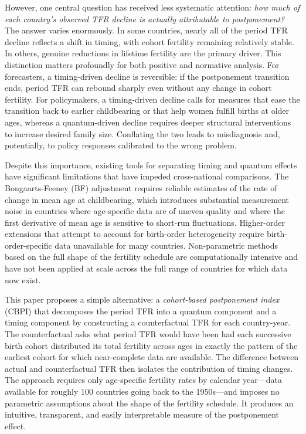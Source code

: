 \documentclass[12pt]{article}
\begin{document}
However, one central question has received less systematic attention:
\emph{how much of each country's observed TFR decline is actually
attributable to postponement?}  The answer varies enormously.  In some
countries, nearly all of the period TFR decline reflects a shift in
timing, with cohort fertility remaining relatively stable.  In others,
genuine reductions in lifetime fertility are the primary driver.  This
distinction matters profoundly for both positive and normative
analysis.  For forecasters, a timing-driven decline is reversible: if
the postponement transition ends, period TFR can rebound sharply even
without any change in cohort fertility.  For policymakers, a
timing-driven decline calls for measures that ease the transition back
to earlier childbearing or that help women fulfill births at older
ages, whereas a quantum-driven decline requires deeper structural
interventions to increase desired family size.  Conflating the two
leads to misdiagnosis and, potentially, to policy responses calibrated
to the wrong problem.

Despite this importance, existing tools for separating timing and
quantum effects have significant limitations that have impeded
cross-national comparisons.  The Bongaarts-Feeney (BF) adjustment
requires reliable estimates of the rate of change in mean age at
childbearing, which introduces substantial measurement noise in
countries where age-specific data are of uneven quality and where the
first derivative of mean age is sensitive to short-run fluctuations.
Higher-order extensions that attempt to account for birth-order
heterogeneity \citep{KohlerOrtega2002} require birth-order-specific
data unavailable for many countries.  Non-parametric methods based on
the full shape of the fertility schedule \citep{Zeng2011} are
computationally intensive and have not been applied at scale across the
full range of countries for which data now exist.

This paper proposes a simple alternative: a \emph{cohort-based
postponement index} (CBPI) that decomposes the period TFR into a
quantum component and a timing component by constructing a
counterfactual TFR for each country-year.  The counterfactual asks
what period TFR would have been had each successive birth cohort
distributed its total fertility across ages in exactly the pattern of
the earliest cohort for which near-complete data are available.  The
difference between actual and counterfactual TFR then isolates the
contribution of timing changes.  The approach requires only
age-specific fertility rates by calendar year---data available for
roughly 100 countries going back to the 1950s---and imposes no
parametric assumptions about the shape of the fertility schedule.  It
produces an intuitive, transparent, and easily interpretable measure
of the postponement effect.
\end{document}
